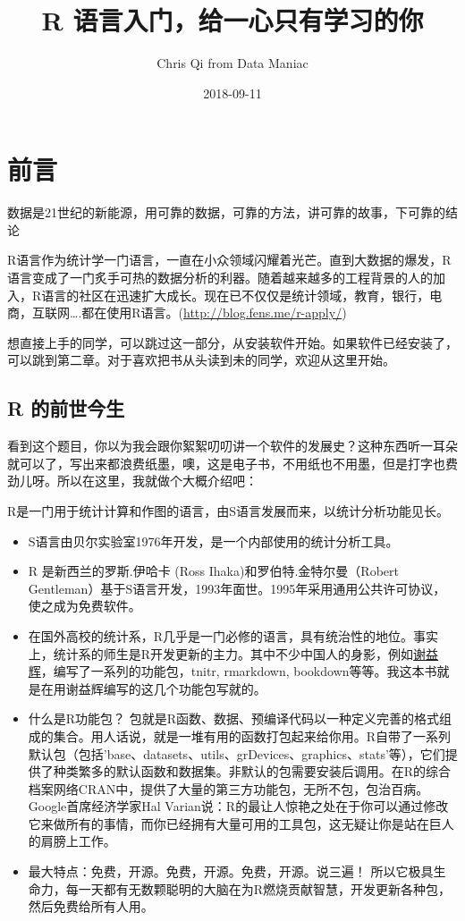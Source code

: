 \documentclass[]{book}
\title{R 语言入门，给一心只有学习的你}
\author{Chris Qi from Data Maniac}
\date{2018-09-11}
\begin{document}
\maketitle

{
\setcounter{tocdepth}{1}
\tableofcontents
}
\chapter{前言}

数据是21世纪的新能源，用可靠的数据，可靠的方法，讲可靠的故事，下可靠的结论

R语言作为统计学一门语言，一直在小众领域闪耀着光芒。直到大数据的爆发，R语言变成了一门炙手可热的数据分析的利器。随着越来越多的工程背景的人的加入，R语言的社区在迅速扩大成长。现在已不仅仅是统计领域，教育，银行，电商，互联网\ldots{}.都在使用R语言。(\url{http://blog.fens.me/r-apply/})

想直接上手的同学，可以跳过这一部分，从安装软件开始。如果软件已经安装了，可以跳到第二章。对于喜欢把书从头读到未的同学，欢迎从这里开始。

\hypertarget{r-}{%
\section{R 的前世今生}\label{r-}}

看到这个题目，你以为我会跟你絮絮叨叨讲一个软件的发展史？这种东西听一耳朵就可以了，写出来都浪费纸墨，噢，这是电子书，不用纸也不用墨，但是打字也费劲儿呀。所以在这里，我就做个大概介绍吧：

R是一门用于统计计算和作图的语言，由S语言发展而来，以统计分析功能见长。

\begin{itemize}
\item
  S语言由贝尔实验室1976年开发，是一个内部使用的统计分析工具。
\item
  R 是新西兰的罗斯.伊哈卡 (Ross Ihaka)和罗伯特.金特尔曼（Robert
  Gentleman）基于S语言开发，1993年面世。1995年采用通用公共许可协议，使之成为免费软件。
\item
  在国外高校的统计系，R几乎是一门必修的语言，具有统治性的地位。事实上，统计系的师生是R开发更新的主力。其中不少中国人的身影，例如\href{https://yihui.name/}{谢益辉}，编写了一系列的功能包，tnitr,
  rmarkdown,
  bookdown等等。我这本书就是在用谢益辉编写的这几个功能包写就的。
\item
  什么是R功能包？
  包就是R函数、数据、预编译代码以一种定义完善的格式组成的集合。用人话说，就是一堆有用的函数打包起来给你用。R自带了一系列默认包（包括'base、datasets、utils、grDevices、graphics、stats'等），它们提供了种类繁多的默认函数和数据集。非默认的包需要安装后调用。在R的综合档案网络CRAN中，提供了大量的第三方功能包，无所不包，包治百病。
  Google首席经济学家Hal
  Varian说：R的最让人惊艳之处在于你可以通过修改它来做所有的事情，而你已经拥有大量可用的工具包，这无疑让你是站在巨人的肩膀上工作。
\item
  最大特点：免费，开源。免费，开源。免费，开源。说三遍！
  所以它极具生命力，每一天都有无数颗聪明的大脑在为R燃烧贡献智慧，开发更新各种包，然后免费给所有人用。
\end{itemize}
\end{document}
